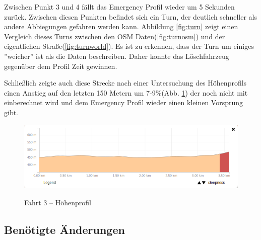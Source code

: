 Zwischen Punkt 3 und 4 fällt das Emergency Profil wieder um 5 Sekunden zurück. Zwischen diesen Punkten befindet sich ein Turn, der deutlich schneller als andere Abbiegungen gefahren werden kann. Abbildung \ref{fig:turn} zeigt einen Vergleich dieses Turns zwischen den OSM Daten(\ref{fig:turnosm}) und der eigentlichen Straße(\ref{fig:turnworld}). Es ist zu erkennen, dass der Turn um einiges ''weicher'' ist als die Daten beschreiben. Daher konnte das Löschfahrzeug gegenüber dem Profil Zeit gewinnen.

Schließlich zeigte auch diese Strecke nach einer Untersuchung des Höhenprofils einen Anstieg auf den letzten 150 Metern um 7-9$\%$(Abb. \ref{fig:profile2}) der noch nicht mit einberechnet wird und dem Emergency Profil wieder einen kleinen Vorsprung gibt.

\begin{figure}[h]
\centering
\caption{Fahrt 3 -- Höhenprofil}
\label{fig:profile2}
\includegraphics[width = 0.90 \textwidth]{../media/Fahrt3_Profile.png} \\
\end{figure}


\subsection{Benötigte Änderungen}

